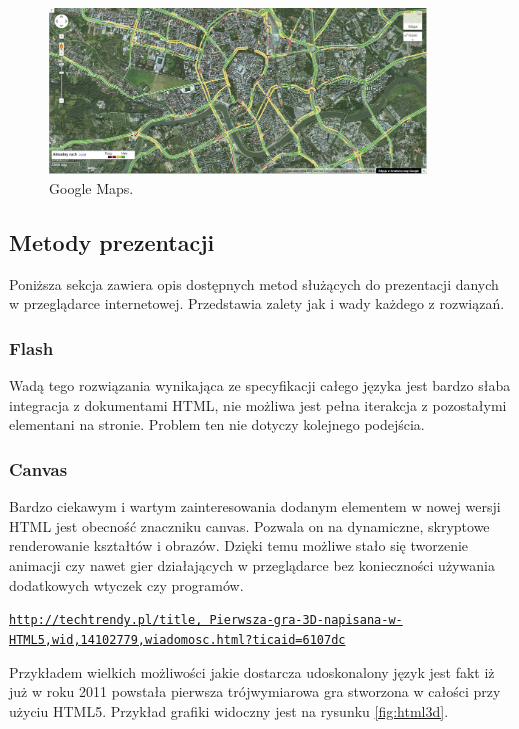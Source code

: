 \begin{figure}[H]
  \centering
    \includegraphics[width=100mm]{ge/gm_1.jpg}
  \caption{Google Maps.}
  \label{fig:googleMaps_1}
\end{figure}

\subsection{Metody prezentacji}
\label{subsec:presentation}

Poniższa sekcja zawiera opis dostępnych metod służących do prezentacji danych w przeglądarce internetowej. Przedstawia zalety jak i wady każdego z rozwiązań.


\subsubsection{Flash}
\label{subsubsec:graphicFlash}


Wadą tego rozwiązania wynikająca ze specyfikacji całego języka jest bardzo słaba integracja z dokumentami HTML, nie możliwa jest pełna iterakcja z pozostałymi elementani na stronie. Problem ten nie dotyczy kolejnego podejścia.

\subsubsection{Canvas}
\label{subsubsec:canvas}


Bardzo ciekawym i wartym zainteresowania dodanym elementem w nowej wersji HTML jest obecność znaczniku canvas. Pozwala on na dynamiczne, skryptowe renderowanie kształtów i obrazów. Dzięki temu możliwe stało się tworzenie animacji czy nawet gier działających w przeglądarce bez konieczności używania dodatkowych wtyczek czy programów.

\underline{\texttt{http://techtrendy.pl/title, Pierwsza-gra-3D-napisana-w-HTML5,wid,14102779,wiadomosc.html?ticaid=6107dc}}

Przykładem wielkich możliwości jakie dostarcza udoskonalony język jest fakt iż już w roku 2011 powstała pierwsza trójwymiarowa gra stworzona w całości przy użyciu HTML5. Przykład grafiki widoczny jest na rysunku \ref{fig:html3d}.

